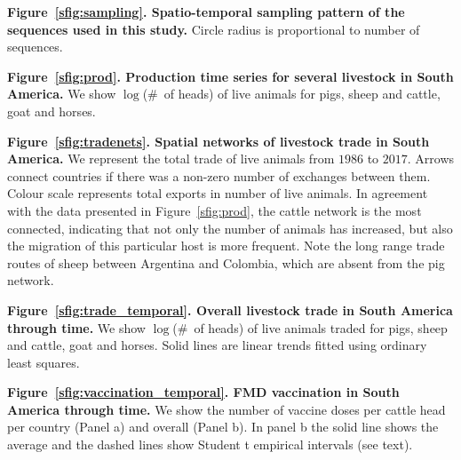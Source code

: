 \documentclass[a4paper,10pt]{article}
\begin{document}
\textbf{Figure~\ref{sfig:sampling}. Spatio-temporal sampling pattern of the sequences used in this study.} Circle radius is proportional to number of sequences.


\textbf{Figure~\ref{sfig:prod}. Production time series for several livestock in South America.}
We show $\log$(\#~of heads) of live animals for pigs, sheep and cattle, goat and horses.

\textbf{Figure~\ref{sfig:tradenets}. Spatial networks of livestock trade in South America.}
We represent the total trade of live animals from $1986$ to $2017$.
Arrows connect countries if there was a non-zero number of exchanges between them.
Colour scale represents total exports in number of live animals.
In agreement with the data presented in Figure~\ref{sfig:prod}, the cattle network is the most connected, indicating that not only the number of animals has increased, but also the migration of this particular host is more frequent. 
Note the long range trade routes of sheep between Argentina and Colombia, which are absent from the pig network.

\textbf{Figure~\ref{sfig:trade_temporal}. Overall livestock trade in South America through time.}
We show $\log$(\#~of heads) of live animals traded for pigs, sheep and cattle, goat and horses.
Solid lines are linear trends fitted using ordinary least squares.


\textbf{Figure~\ref{sfig:vaccination_temporal}. FMD vaccination  in South America through time.}
We show the number of vaccine doses per cattle head per country (Panel a) and overall (Panel b).
In panel b the solid line shows the average and the dashed lines show Student t empirical intervals (see text).
\end{document}
